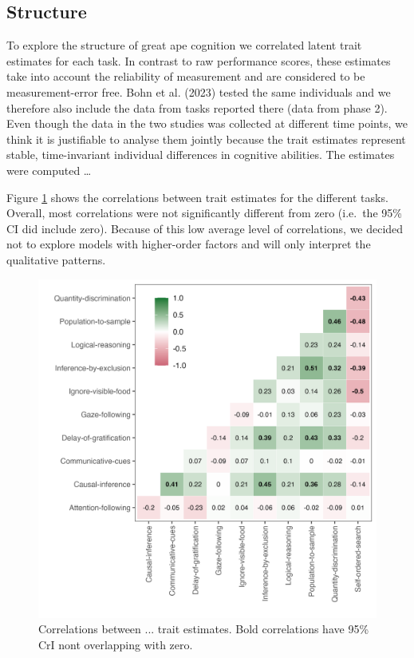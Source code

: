 \documentclass[
  man,floatsintext]{apa6}
\begin{document}
\hypertarget{structure}{%
\subsection{Structure}\label{structure}}

To explore the structure of great ape cognition we correlated latent trait estimates for each task. In contrast to raw performance scores, these estimates take into account the reliability of measurement and are considered to be measurement-error free. Bohn et al. (2023) tested the same individuals and we therefore also include the data from tasks reported there (data from phase 2). Even though the data in the two studies was collected at different time points, we think it is justifiable to analyse them jointly because the trait estimates represent stable, time-invariant individual differences in cognitive abilities. The estimates were computed \ldots{}

Figure \ref{fig:figcor} shows the correlations between trait estimates for the different tasks. Overall, most correlations were not significantly different from zero (i.e.~the 95\% CI did include zero). Because of this low average level of correlations, we decided not to explore models with higher-order factors and will only interpret the qualitative patterns.

\begin{figure}

{\centering \includegraphics[width=0.7\linewidth]{../visuals/task_level_cor} 

}

\caption{Correlations between ... trait estimates. Bold correlations have 95\% CrI nont overlapping with zero.}\label{fig:figcor}
\end{figure}
\end{document}
